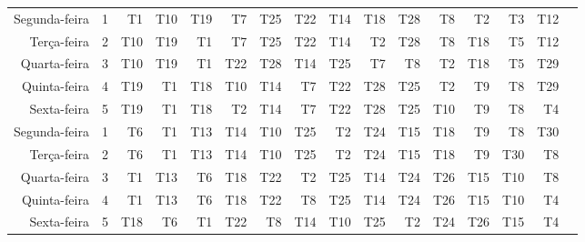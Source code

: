 \begin{table}[!htb]
\begin{tabular}{rrrrrrrrrrrrrrrr}
        \midrule
        Segunda-feira & 1 & T1 & T10 & T19 & T7 & T25 & T22 & T14 & T18 & T28 & T8 & T2 & T3 & T12 \\
        Terça-feira & 2 & T10 & T19 & T1 & T7 & T25 & T22 & T14 & T2 & T28 & T8 & T18 & T5 & T12 \\
        Quarta-feira & 3 & T10 & T19 & T1 & T22 & T28 & T14 & T25 & T7 & T8 & T2 & T18 & T5 & T29 \\
        Quinta-feira & 4 & T19 & T1 & T18 & T10 & T14 & T7 & T22 & T28 & T25 & T2 & T9 & T8 & T29 \\
        Sexta-feira & 5 & T19 & T1 & T18 & T2 & T14 & T7 & T22 & T28 & T25 & T10 & T9 & T8 & T4 \\
        \midrule
        Segunda-feira & 1 & T6 & T1 & T13 & T14 & T10 & T25 & T2 & T24 & T15 & T18 & T9 & T8 & T30 \\
        Terça-feira & 2 & T6 & T1 & T13 & T14 & T10 & T25 & T2 & T24 & T15 & T18 & T9 & T30 & T8 \\
        Quarta-feira & 3 & T1 & T13 & T6 & T18 & T22 & T2 & T25 & T14 & T24 & T26 & T15 & T10 & T8 \\
        Quinta-feira & 4 & T1 & T13 & T6 & T18 & T22 & T8 & T25 & T14 & T24 & T26 & T15 & T10 & T4 \\
        Sexta-feira & 5 & T18 & T6 & T1 & T22 & T8 & T14 & T10 & T25 & T2 & T24 & T26 & T15 & T4 \\
        \bottomrule
    \end{tabular}
\end{table}
